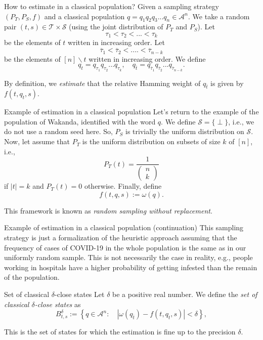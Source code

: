 \documentclass{beamer}
\begin{document}
\begin{frame}{How to estimate in a classical population?} 
Given a sampling strategy $\left(P_T, P_S, f \right)$ and a classical population $q = q_1 q_2 q_3 ... q_n \in \mathcal{A}^n$. We take a random pair $(t, s) \in \mathcal{T} \times \mathcal{S}$ (using the joint distribution of $P_T$ and $P_S$). Let
$$
\tau_1 < \tau_2 < ... < \tau_{k}
$$
be the elements of $t$ written in increasing order. Let
$$
\overline{\tau }_1 < \overline{\tau}_2 < .... < \overline{\tau}_{n-k}
$$
be the elements of $[n]\backslash t$ written in increasing order. We define
$$
q_t = q_{\tau_1} q_{\tau_2} ... q_{\tau_k}, \quad q_{\overline{t}} = q_{\overline{\tau}_1} q_{\overline{\tau}_2} ... q_{\overline{\tau}_{n-k}}.
$$

By definition, we \emph{estimate} that the relative Hamming weight of $q_{\overline{t}}$ is given by $f\left(t, q_t, s\right)$.
\end{frame}

\begin{frame}{Example of estimation in a classical population} 
Let's return to the example of the population of Wakanda, identified with the word $q$. We define $\mathcal{S} = \{\perp\}$, i.e., we do not use a random seed here. So, $P_S$ is trivially the uniform distribution on $\mathcal{S}$. Now, let assume that $P_T$ is the uniform distribution on subsets of size $k$ of $[n]$, i.e., 
$$P_T(t) = \frac{1}{\left(\!\!\! \begin{array}{c} n \\ k \end{array} \!\!\!\right)}$$
if $|t| = k$ and $P_T(t) = 0$ otherwise. Finally, define $$f(t, q, s) := \omega(q).$$ 

This framework is known as \emph{random sampling without replacement}.

\end{frame}

\begin{frame}{Example of estimation in a classical population (continuation)} 
This sampling strategy is just a formalization of the heuristic approach assuming that the frequency of cases of COVID-19 in the whole population is the same as in our uniformly random sample. This is not necessarily the case in reality, e.g., people working in hospitals have a higher probability of getting infested than the remain of the population.
\end{frame}

\begin{frame}{Set of classical $\delta$-close states} 
Let $\delta$ be a positive real number. We define the  \emph{set of classical $\delta$-close states} as
$$
B_{t,s}^{\delta} := \left\{ q\in\mathcal{A}^n: \quad \left| \omega\left(q_{\overline{t}}\right) - f\left(t, q_t, s\right) \right| <  \delta \right\},
$$

This is the set of states for which the estimation is fine up to the precision $\delta$.
\end{frame}
\end{document}
